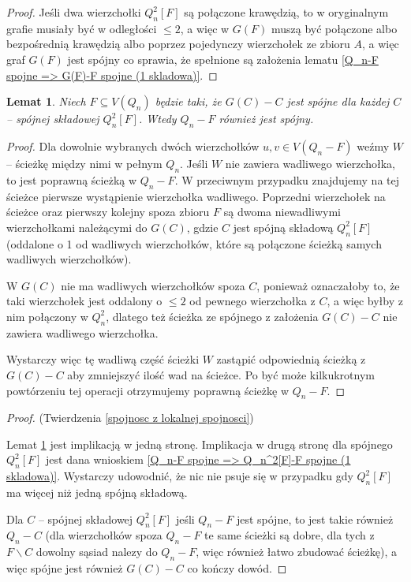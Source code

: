 \documentclass{pracamgr}
\newtheorem{lemma}[theorem]{Lemat}
\begin{document}
    \begin{proof}
     Jeśli dwa wierzchołki $Q_n^2[F]$ są połączone krawędzią, to w oryginalnym grafie musiały być w odległości $\le 2$, a więc w $G(F)$ muszą być połączone
     albo bezpośrednią krawędzią albo poprzez pojedynczy wierzchołek ze zbioru $A$, a więc graf $G(F)$ jest spójny co sprawia,
     że spełnione są założenia lematu \ref{Q_n-F spojne => G(F)-F spojne (1 skladowa)}.
    \end{proof}
    \begin{lemma}\label{Q_n^2[F]-F spojne => Q_n-F spojne}
     Niech $F\subseteq V(Q_n)$ będzie taki, że $G(C)-C$ jest spójne dla każdej $C$ -- spójnej składowej $Q_n^2[F]$. Wtedy $Q_n-F$ również jest spójny.
    \end{lemma}
    \begin{proof}
     Dla dowolnie wybranych dwóch wierzchołków $u,v\in V(Q_n-F)$ weźmy $W$ -- ścieżkę między nimi w pełnym $Q_n$. Jeśli $W$ nie zawiera wadliwego wierzchołka,
     to jest poprawną ścieżką w $Q_n-F$. W przeciwnym przypadku znajdujemy na tej ścieżce pierwsze wystąpienie wierzchołka wadliwego.
     Poprzedni wierzchołek na ścieżce oraz pierwszy kolejny spoza zbioru $F$ są dwoma niewadliwymi wierzchołkami należącymi do $G(C)$, gdzie $C$
     jest spójną składową $Q_n^2[F]$ (oddalone o 1 od wadliwych wierzchołków, które są połączone ścieżką samych wadliwych wierzchołków).
     
     W $G(C)$ nie ma wadliwych wierzchołków spoza $C$, ponieważ oznaczałoby to, że taki wierzchołek jest oddalony o $\le 2$ od pewnego wierzchołka z $C$,
     a więc byłby z nim połączony w $Q_n^2$, dlatego też ścieżka ze spójnego z założenia $G(C)-C$ nie zawiera wadliwego wierzchołka.
     
     Wystarczy więc tę wadliwą część ścieżki $W$ zastąpić odpowiednią ścieżką z $G(C)-C$ aby zmniejszyć ilość wad na ścieżce.
     Po być może kilkukrotnym powtórzeniu tej operacji otrzymujemy poprawną ścieżkę w $Q_n-F$.
    \end{proof}\newpage
    \begin{proof}
     (Twierdzenia \ref{spojnosc z lokalnej spojnosci})
     
     Lemat \ref{Q_n^2[F]-F spojne => Q_n-F spojne} jest implikacją w jedną stronę.
     Implikacja w drugą stronę dla spójnego $Q_n^2[F]$ jest dana wnioskiem \ref{Q_n-F spojne => Q_n^2[F]-F spojne (1 skladowa)}.
     Wystarczy udowodnić, że nic nie psuje się w przypadku gdy $Q_n^2[F]$ ma więcej niż jedną spójną składową.
     
     Dla $C$ -- spójnej składowej $Q_n^2[F]$ jeśli $Q_n-F$ jest spójne, to jest takie również $Q_n-C$
     (dla wierzchołków spoza $Q_n-F$ te same ścieżki są dobre, dla tych z  $F\backslash C$ dowolny sąsiad nalezy do $Q_n-F$, więc również łatwo zbudować ścieżkę),
     a więc spójne jest również $G(C)-C$ co kończy dowód.
    \end{proof}
\end{document}
